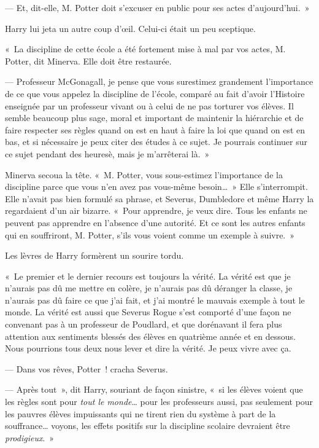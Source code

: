 --- Et, dit-elle, M. Potter doit s'excuser en public pour ses actes d'aujourd'hui.~»

Harry lui jeta un autre coup d'œil.
Celui-ci était un peu sceptique.

«~La discipline de cette école a été fortement mise à mal par vos actes, M. Potter, dit Minerva.
Elle doit être restaurée.

--- Professeur McGonagall, je pense que vous surestimez grandement l'importance de ce que vous appelez la discipline de l'école, comparé au fait d'avoir l'Histoire enseignée par un professeur vivant ou à celui de ne pas torturer vos élèves.
Il semble beaucoup plus sage, moral et important de maintenir la hiérarchie et de faire respecter ses règles quand on est en haut à faire la loi que quand on est en bas, et si nécessaire je peux citer des études à ce sujet.
Je pourrais continuer sur ce sujet pendant des heuresè, mais je m'arrêterai là.~»

Minerva secoua la tête.
«~M. Potter, vous sous-estimez l'importance de la discipline parce que vous n'en avez pas vous-même besoin…~»
Elle s'interrompit.
Elle n'avait pas bien formulé sa phrase, et Severus, Dumbledore et même Harry la regardaient d'un air bizarre.
«~Pour apprendre, je veux dire.
Tous les enfants ne peuvent pas apprendre en l'absence d'une autorité.
Et ce sont les autres enfants qui en souffriront, M. Potter, s'ils vous voient comme un exemple à suivre.~»

Les lèvres de Harry formèrent un sourire tordu.

«~Le premier et le dernier recours est toujours la vérité.
La vérité est que je n'aurais pas dû me mettre en colère, je n'aurais pas dû déranger la classe, je n'aurais pas dû faire ce que j'ai fait, et j'ai montré le mauvais exemple à tout le monde.
La vérité est aussi que Severus Rogue s'est comporté d'une façon ne convenant pas à un professeur de Poudlard, et que dorénavant il fera plus attention aux sentiments blessés des élèves en quatrième année et en dessous.
Nous pourrions tous deux nous lever et dire la vérité.
Je peux vivre avec ça.

--- Dans vos rêves, Potter~! cracha Severus.

--- Après tout~», dit Harry, souriant de façon sinistre, «~si les élèves voient que les règles sont pour \emph{tout le monde}… pour les professeurs aussi, pas seulement pour les pauvres élèves impuissants qui ne tirent rien du système à part de la souffrance… voyons, les effets positifs sur la discipline scolaire devraient être \emph{prodigieux}.~»


